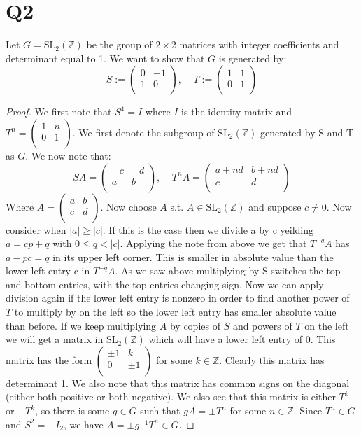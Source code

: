 \documentclass{article}
\begin{document}
\section*{Q2}
Let $G = \text{SL}_2(\mathbb{Z})$ be the group of $2 \times 2$ matrices with integer coefficients and determinant equal to 1. We want to show that $G$ is generated by:
$$S:=\begin{pmatrix}
0 & -1\\
1 & 0\\
\end{pmatrix}, \;\;\;\;T:=\begin{pmatrix}
1 & 1\\
0 & 1\\
\end{pmatrix}$$
\begin{proof}
We first note that $S^4=I$ where $I$ is the identity matrix and $T^n=\begin{pmatrix}
1 & n\\
0 & 1\\
\end{pmatrix}$.
We first denote the subgroup of $\text{SL}_2(\mathbb{Z})$ generated by S and T as $G$. We now note that:
$$SA=\begin{pmatrix}
-c & -d\\
a & b\\
\end{pmatrix}, \;\;\;\;T^nA=\begin{pmatrix}
a+nd & b+nd\\
c & d\\
\end{pmatrix}$$
Where $A=\begin{pmatrix}
a & b\\
c & d\\
\end{pmatrix}$. Now choose $A$ s.t. $A\in\text{SL}_2(\mathbb{Z})$ and suppose $c\neq0$. Now consider when $|a| \geq |c|$. If this is the case then we divide a by c yeilding $a = cp + q$ with $0 \leq q < |c|$. Applying the note from above we get that $T^{-q} A$ has $a - pc = q$ in its upper left corner. This is smaller in absolute value than the lower left entry c in $T^{-q}A$. As we saw above multiplying by S switches the top and bottom entries, with the top entries changing sign. Now we can apply division again if the lower left entry is nonzero in order to find another power of $T$ to multiply by on the left so the lower left entry has smaller absolute value than before. If we keep multiplying $A$ by copies of $S$ and powers of $T$ on the left we will get a matrix in $\text{SL}_2 (\mathbb{Z})$ which will have a lower left entry of 0. This matrix has the form $\begin{pmatrix} 
\pm 1 & k\\
0 & \pm 1\\
\end{pmatrix}$ for some $k \in \mathbb{Z}$. Clearly this matrix has determinant 1. We also note that this matrix has common signs on the diagonal (either both positive or both negative). We also see that this matrix is either $T^k$ or $-T^k$, so there is some $g\in G$ such that $gA = \pm T^n$ for some $n\in\mathbb{Z}$. Since $T^n\in G$ and $S^2=-I_2$, we have $A=\pm g^{-1}T^n\in G$.
\end{proof}
\end{document}
